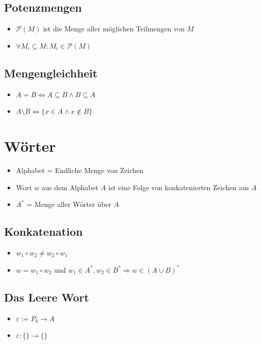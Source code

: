 \documentclass[a4paper,portrait]{scrartcl}
\begin{document}
\subsection{Potenzmengen}
\begin{itemize}
\item $ \mathcal{P} (M) $ ist die Menge aller möglichen Teilmengen von $M$ 
\item $ \forall M_{i} \subseteq M: M_{i} \in \mathcal{P} (M) $
\end{itemize}
\subsection{Mengengleichheit}
\begin{itemize}
\item $ A=B \Leftrightarrow A \subseteq B \wedge B \subseteq A $ 
\item $ A \setminus B \Leftrightarrow \lbrace x \in A \wedge x \notin B \rbrace $
\end{itemize}
\section{Wörter}
\begin{itemize}
\item Alphabet = Endliche Menge von Zeichen 
\item Wort $w$ aus dem Alphabet $A$ ist eine Folge von konkatenierten Zeichen aus $A$ 
\item $A^{*}$ = Menge aller Wörter über $A$
\end{itemize}
\subsection{Konkatenation}
\begin{itemize}
\item $w_{1} \circ w_{2} \neq w_{2} \circ w_{1}$ 
\item $w = w_{1} \circ w_{2} $ und $ w_{1} \in A^{*}, w_{2} \in B^{*} \Rightarrow w \in (A \cup B)^{*}$
\end{itemize}
\subsection{Das Leere Wort}
\begin{itemize}
\item $ \varepsilon := P_{0} \rightarrow A $ 
\item $ \varepsilon : \lbrace\rbrace\rightarrow\lbrace\rbrace $
\end{itemize}
\end{document}
